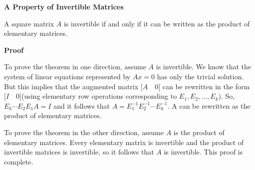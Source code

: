 \nopagenumbers
{\bf A Property of Invertible Matrices}
\vskip 1mm

\vskip 6pt
A square matrix $A$ is invertible if and only if it can be written as the product of elementary matrices.

\vskip 10pt
{\bf Proof}

\vskip 6pt
To prove the theorem in one direction, assume $A$ is invertible. We know that the system of linear equations represented by $Ax=0$ has only the trivial solution. But this implies that the augmented matrix $\bigl\lbrack A\quad 0\bigr\rbrack$ can be rewritten in the form $\bigl\lbrack I\quad 0\bigr\rbrack$(using elementary row operations corresponding to $E_1,E_2,\ldots,E_k$). So, $E_k\cdots E_2E_1A=I$ and it follows that $A=E^{-1}_1E^{-1}_2\cdots E^{-1}_k$. A can be rewritten as the product of elementary matrices.

\vskip 1mm
To prove the theorem in the other direction, assume $A$ is the product of elementary matrices. Every elementary matrix is invertible and the product of invertible matrices is invertible, so it follows that $A$ is invertible. This proof is complete.

\vfill\eject
\bye
